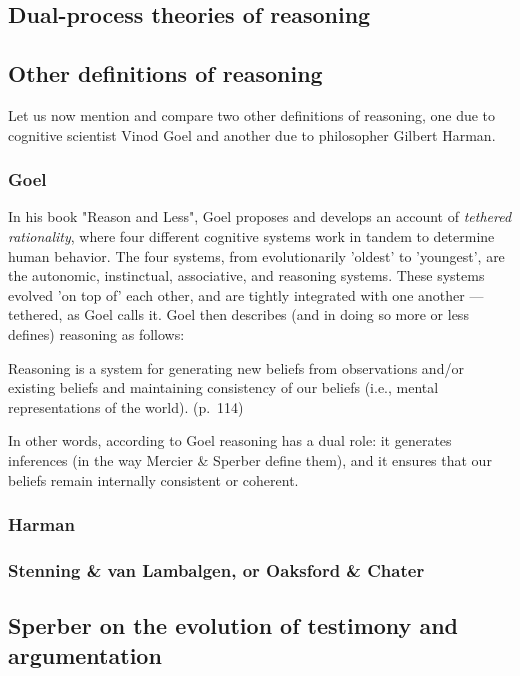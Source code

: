 \subsection{Dual-process theories of reasoning}

\subsection{Other definitions of reasoning}
Let us now mention and compare two other definitions of reasoning, one due to cognitive scientist Vinod Goel and another due to philosopher Gilbert Harman.

\subsubsection{Goel}
In his \citeyear{Goel22} book "Reason and Less", Goel proposes and develops an account of \emph{tethered rationality}, where four different cognitive systems work in tandem to determine human behavior. The four systems, from evolutionarily 'oldest' to 'youngest', are the autonomic, instinctual, associative, and reasoning systems. These systems evolved 'on top of' each other, and are tightly integrated with one another --- tethered, as Goel calls it.
Goel then describes (and in doing so more or less defines) reasoning as follows:
\begin{quoting}
    Reasoning is a system for generating new beliefs from observations and/or existing beliefs and maintaining consistency of our beliefs (i.e., mental representations of the world).
    \hfill (p.~114)
\end{quoting}
In other words, according to Goel reasoning has a dual role: it generates inferences (in the way Mercier \& Sperber define them), and it ensures that our beliefs remain internally consistent or coherent.

\subsubsection{Harman}

\subsubsection{Stenning \& van Lambalgen, or Oaksford \& Chater}

\subsection{Sperber on the evolution of testimony and argumentation}
\label{sec:Sperber01}

